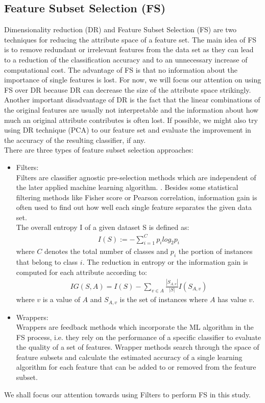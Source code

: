 \documentclass{sig-alternate}
\begin{document}
\subsection{Feature Subset Selection (FS)}
Dimensionality reduction (DR) and Feature Subset Selection (FS) are two techniques for reducing the attribute space of a feature set. The main idea of FS is to remove redundant or irrelevant features from the data set as they can lead to a reduction of the classification accuracy and to an unnecessary increase of computational cost. The advantage of FS is that no information about the importance of single features is lost. For now, we will focus our attention on using FS over DR because DR can decrease the size of the attribute space strikingly. Another important disadvantage of DR is the fact that the linear combinations of the original features are usually not interpretable and the information about how much an original attribute contributes is often lost. If possible, we might also try using DR technique (PCA) to our feature set and evaluate the improvement in the accuracy of the resulting classifier, if any.\\
There are three types of feature subset selection approaches:
\begin{itemize}
\item Filters:\\
Filters are classifier agnostic pre-selection methods which are independent of the later
applied machine learning algorithm. . Besides some statistical filtering methods like Fisher score or Pearson correlation, information gain is often used to find out
how well each single feature separates the given data set.\\
The overall entropy I of a given dataset S is defined as:
\begin{align}
I(S) := - \sum_{i=1}^{C} p_i log_2 p_i
\end{align}
where $C$ denotes the total number of classes and $p_i$ the portion of instances that belong to class $i$. The reduction in entropy or the information gain is computed for each attribute according to:
\begin{align}
IG(S,A) = I(S) - \sum_{v \in A} \frac{|S_{A,v}|}{|S|}I(S_{A,v})
\end{align}
where $v$ is a value of $A$ and $S_{A,v}$ is the set of instances where $A$ has value $v$.
\item Wrappers:\\
Wrappers are feedback methods which incorporate the ML algorithm in the FS process,
i.e. they rely on the performance of a specific classifier to evaluate the quality of a set of features. Wrapper methods search through the space of feature subsets and calculate
the estimated accuracy of a single learning algorithm for each feature that can be added
to or removed from the feature subset.
\end{itemize} 
We shall focus our attention towards using Filters to perform FS in this study.
\end{document}
